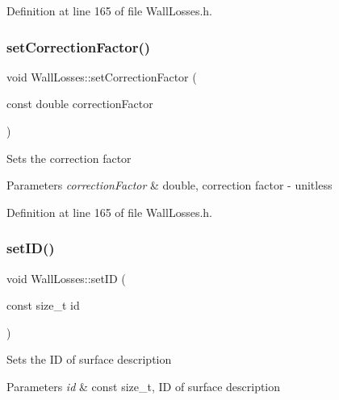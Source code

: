 Definition at line 165 of file Wall\+Losses.\+h.

\mbox{\label{class_wall_losses_affdf3f6c3d54d73c7f91e1515fb12533}} 
\subsubsection{\texorpdfstring{set\+Correction\+Factor()}{setCorrectionFactor()}\hspace{0.1cm}{\footnotesize\ttfamily [3/3]}}
{\footnotesize\ttfamily void Wall\+Losses\+::set\+Correction\+Factor (\begin{DoxyParamCaption}\item[{const double}]{correction\+Factor }\end{DoxyParamCaption})\hspace{0.3cm}{\ttfamily [inline]}}

Sets the correction factor 
\begin{DoxyParams}{Parameters}
{\em correction\+Factor} & double, correction factor -\/ unitless \\
\hline
\end{DoxyParams}


Definition at line 165 of file Wall\+Losses.\+h.

\mbox{\label{class_wall_losses_a91526efc0eb1bf030ebc1d864a21acdd}} 
\subsubsection{\texorpdfstring{set\+I\+D()}{setID()}\hspace{0.1cm}{\footnotesize\ttfamily [1/3]}}
{\footnotesize\ttfamily void Wall\+Losses\+::set\+ID (\begin{DoxyParamCaption}\item[{const size\+\_\+t}]{id }\end{DoxyParamCaption})\hspace{0.3cm}{\ttfamily [inline]}}

Sets the ID of surface description 
\begin{DoxyParams}{Parameters}
{\em id} & const size\+\_\+t, ID of surface description \\
\hline
\end{DoxyParams}


